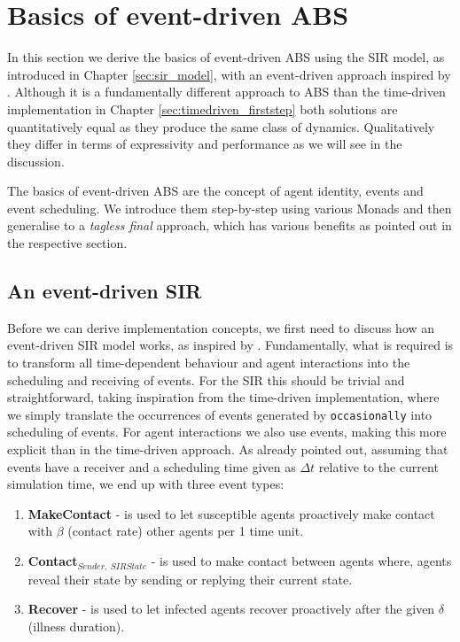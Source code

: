 \section{Basics of event-driven ABS}
\label{sec:eventdriven_basics}
In this section we derive the basics of event-driven ABS using the SIR model, as introduced in Chapter \ref{sec:sir_model}, with an event-driven approach inspired by \cite{macal_agent-based_2010}. Although it is a fundamentally different approach to ABS than the time-driven implementation in Chapter \ref{sec:timedriven_firststep} both solutions are quantitatively equal as they produce the same class of dynamics. Qualitatively they differ in terms of expressivity and performance as we will see in the discussion.

The basics of event-driven ABS are the concept of agent identity, events and event scheduling. We introduce them step-by-step using various Monads and then generalise to a \textit{tagless final} approach, which has various benefits as pointed out in the respective section. 

\subsection{An event-driven SIR}
Before we can derive implementation concepts, we first need to discuss how an event-driven SIR model works, as inspired by \cite{macal_agent-based_2010}. Fundamentally, what is required is to transform all time-dependent behaviour and agent interactions into the scheduling and receiving of events. For the SIR this should be trivial and straightforward, taking inspiration from the time-driven implementation, where we simply translate the occurrences of events generated by \texttt{occasionally} into scheduling of events. For agent interactions we also use events, making this more explicit than in the time-driven approach. As already pointed out, assuming that events have a receiver and a scheduling time given as $\Delta t$ relative to the current simulation time, we end up with three event types:

\begin{enumerate}
	\item \textbf{MakeContact} - is used to let susceptible agents proactively make contact with $\beta$ (contact rate) other agents per 1 time unit.
	\item \textbf{Contact$_{Sender, \ SIRState}$} - is used to make contact between agents where, agents reveal their state by sending or replying their current state.
	\item \textbf{Recover} - is used to let infected agents recover proactively after the given $\delta$ (illness duration). 
\end{enumerate}


